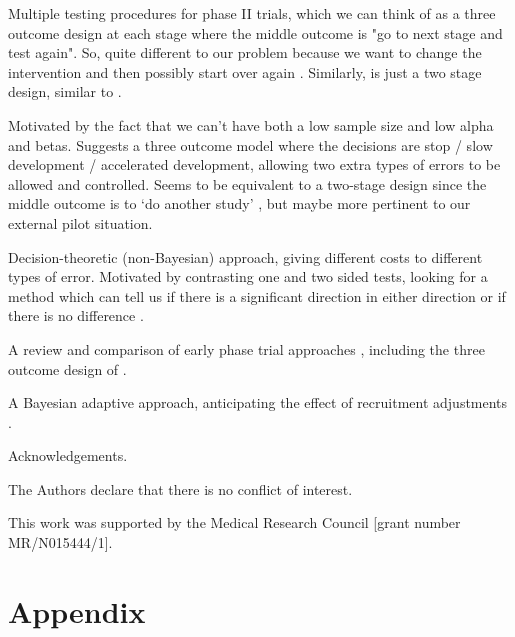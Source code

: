\documentclass[sagev]{sagej} %
\begin{document}
Multiple testing procedures for phase II trials, which we can think of as a three outcome design at each stage where the middle outcome is "go to next stage and test again". So, quite different to our problem because we want to change the intervention and then possibly start over again \cite{Fleming1982}. Similarly, \cite{Shuster2002} is just a two stage design, similar to \cite{Simon1989}. 

Motivated by the fact that we can't have both a low sample size and low alpha and betas. Suggests a three outcome model where the decisions are stop / slow development / accelerated development, allowing two extra types of errors to be allowed and controlled. Seems to be equivalent to a two-stage design since the middle outcome is to `do another study' \cite{Brown2012}, but maybe more pertinent to our external pilot situation.

Decision-theoretic (non-Bayesian) approach, giving different costs to different types of error. Motivated by contrasting one and two sided tests, looking for a method which can tell us if there is a significant direction in either direction or if there is no difference \cite{Emerson1987}.

A review and comparison of early phase trial approaches \cite{Kirby2016}, including the three outcome design of \cite{Brown2012}.

A Bayesian adaptive approach, anticipating the effect of recruitment adjustments \cite{Hampson2017}.


\begin{acks}
Acknowledgements.
\end{acks}

\begin{dci}
The Authors declare that there is no conflict of interest.
\end{dci}

\begin{funding}
This work was supported by the Medical Research Council [grant number MR/N015444/1].
\end{funding}




\section*{Appendix}
\end{document}

